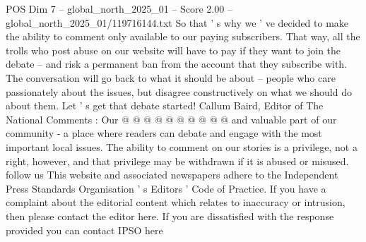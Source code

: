 \begin{textsample}{POS Dim 7 – global\_north\_2025\_01 – Score 2.00 – global\_north\_2025\_01/119716144.txt}
So that ' s why we ' ve decided to make the ability to comment only available to our paying subscribers.
That way, all the trolls who post abuse on our website will have to pay if they want to join the debate -- and risk a permanent ban from the account that they subscribe with.
The conversation will go back to what it should be about -- people who care passionately about the issues, but disagree constructively on what we should do about them.
Let ' s get that debate started!
Callum Baird, Editor of The National Comments : Our @ @ @ @ @ @ @ @ @ @ and valuable part of our community - a place where readers can debate and engage with the most important local issues.
The ability to comment on our stories is a privilege, not a right, however, and that privilege may be withdrawn if it is abused or misused. follow us This website and associated newspapers adhere to the Independent Press Standards Organisation ' s Editors ' Code of Practice.
If you have a complaint about the editorial content which relates to inaccuracy or intrusion, then please contact the editor here.
If you are dissatisfied with the response provided you can contact IPSO here

\end{textsample}
